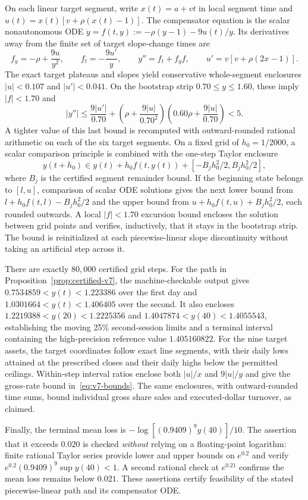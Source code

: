 \documentclass[review,hidelinks,onefignum,onetabnum]{siamonline250211}
\begin{document}
On each linear target segment, write $x(t)=a+vt$ in local segment time and $u(t)=x(t)[v+\rho(x(t)-1)]$. The compensator equation is the scalar nonautonomous ODE $\dot y=f(t,y):=-\rho(y-1)-9u(t)/y$. Its derivatives away from the finite set of target slope-change times are
\[
f_y=-\rho+\frac{9u}{y^2},\qquad f_t=-\frac{9u'}y,\qquad
 y''=f_t+f_y f,\qquad u'=v[v+\rho(2x-1)].
\]
The exact target plateaus and slopes yield conservative whole-segment enclosures $|u|<0.107$ and $|u'|<0.041$. On the bootstrap strip $0.70\le y\le1.60$, these imply $|f|<1.70$ and
\[
|y''|\le\frac{9|u'|}{0.70}
+\left(\rho+\frac{9|u|}{0.70^2}\right)
\left(0.60\rho+\frac{9|u|}{0.70}\right)<5.
\]
A tighter value of this last bound is recomputed with outward-rounded rational arithmetic on each of the six target segments. On a fixed grid of $h_0=1/2000$, a scalar comparison principle is combined with the one-step Taylor enclosure
\[
 y(t+h_0)\in y(t)+h_0 f(t,y(t))+[-B_j h_0^2/2,B_j h_0^2/2],
\]
where $B_j$ is the certified segment remainder bound. If the beginning state belongs to $[l,u]$, comparison of scalar ODE solutions gives the next lower bound from $l+h_0 f(t,l)-B_jh_0^2/2$ and the upper bound from $u+h_0 f(t,u)+B_jh_0^2/2$, each rounded outwards. A local $|f|<1.70$ excursion bound encloses the solution between grid points and verifies, inductively, that it stays in the bootstrap strip. The bound is reinitialized at each piecewise-linear slope discontinuity without taking an artificial step across it.

There are exactly $80,000$ certified grid steps. For the path in Proposition~\ref{prop:certified-v7}, the machine-checkable output gives $0.7534859<y(t)<1.223386$ over the first day and $1.0301664<y(t)<1.406405$ over the second. It also encloses $1.2219388<y(20)<1.2225356$ and
$1.4047874<y(40)<1.4055543$, establishing the moving 25\% second-session limits and a terminal interval containing the high-precision reference value $1.405160822$. For the nine target assets, the target coordinates follow exact line segments, with their daily lows attained at the prescribed closes and their daily highs below the permitted ceilings. Within-step interval ratios enclose both $|u|/x$ and $9|u|/y$ and give the gross-rate bound in~\eqref{eq:v7-bounds}. The same enclosures, with outward-rounded time sums, bound individual gross share sales and executed-dollar turnover, as claimed.

Finally, the terminal mean loss is $-\log[(0.9409)^9 y(40)]/10$. The assertion that it exceeds $0.020$ is checked \emph{without} relying on a floating-point logarithm: finite rational Taylor series provide lower and upper bounds on $e^{0.2}$ and verify $e^{0.2}(0.9409)^9\sup y(40)<1$. A second rational check at $e^{0.21}$ confirms the mean loss remains below $0.021$. These assertions certify feasibility of the stated piecewise-linear path and its compensator ODE.
\end{document}
